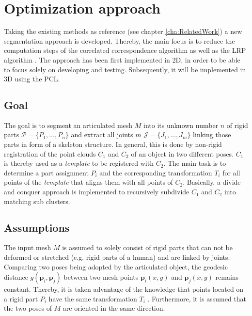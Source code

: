 \chapter{Optimization approach}
\label{cha:TheThesis}

Taking the existing methods as reference (see chapter \ref{cha:RelatedWork}) a new segmentation approach is developed. Thereby, the main focus is to reduce the computation steps of the correlated correspondence algorithm \cite{CorrelatedCorrespondance} as well as the LRP algorithm \cite {guo2016correspondence}. The approach has been first implemented in 2D, in order to be able to focus solely on developing and testing. Subsequently, it will be implemented in 3D using the PCL.

\section{Goal}

The goal is to segment an articulated mesh $M$ into its unknown number $n$ of rigid parts $\mathcal{P} =  \{P_1,\ldots,P_n\}$ and extract all joints $m$ $\mathcal{J} =  \{J_1,\ldots,J_m\}$ linking those parts in form of a skeleton structure. In general, this is done by non-rigid registration of the point clouds $C_1$ and $C_2$ of an object in two different poses. $C_1$ is thereby used as a \textit{template} to be registered with $C_2$. The main task is to determine a part assignment $P_i$ and the corresponding transformation $T_i$ for all points of the \textit{template} that aligns them with all points of $C_2$. Basically, a divide and conquer approach is implemented to recursively subdivide $C_1$ and $C_2$ into matching sub clusters. 

\section{Assumptions}

The input mesh $M$ is assumed to solely consist of rigid parts that can not be deformed or stretched (e.g. rigid parts of a human) and are linked by joints. Comparing two poses being adopted by the articulated object, the geodesic distance $g(\boldsymbol{p}_i,\boldsymbol{p}_j)$ between two mesh points $\boldsymbol{p}_i(x,y)$ and $\boldsymbol{p}_j(x,y)$ remains constant. Thereby, it is taken advantage of the knowledge that points located on a rigid part $P_i$ have the same transformation $T_i$ . Furthermore, it is assumed that the two poses of $M$ are oriented in the same direction.

